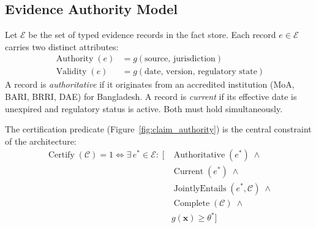 \subsection{Evidence Authority Model}
Let $\mathcal{E}$ be the set of typed evidence records in the fact store. Each record $e \in \mathcal{E}$ carries two distinct attributes:
\begin{align}
    \operatorname{Authority}(e) &= g(\text{source},\, \text{jurisdiction}) \nonumber \\
    \operatorname{Validity}(e) &= g(\text{date},\, \text{version},\, \text{regulatory state}) \nonumber
\end{align}
A record is \emph{authoritative} if it originates from an accredited institution (MoA, BARI, BRRI, DAE) for Bangladesh. A record is \emph{current} if its effective date is unexpired and regulatory status is active. Both must hold simultaneously.

The certification predicate (Figure~\ref{fig:claim_authority}) is the central constraint of the architecture:
\begin{equation}
    \label{eq:certification_rule}
    \begin{aligned}
        \operatorname{Certify}(\mathcal{C}) = 1 \iff \exists\, e^* \in \mathcal{E}:\; \Big[ & \operatorname{Authoritative}(e^*) \;\land \\
        & \operatorname{Current}(e^*) \;\land \\
        & \operatorname{JointlyEntails}(e^*, \mathcal{C}) \;\land \\
        & \operatorname{Complete}(\mathcal{C}) \;\land \\
        & g(\mathbf{x}) \ge \theta^* \Big]
    \end{aligned}
\end{equation}

